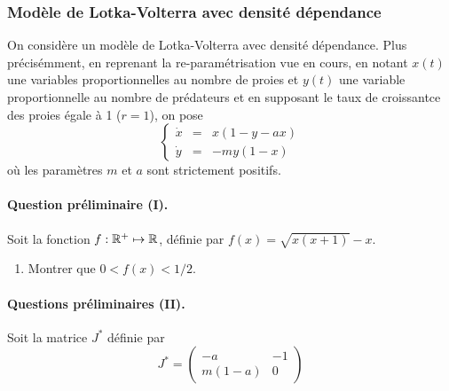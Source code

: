 \subsubsection{Modèle de Lotka-Volterra avec densité dépendance} 

On considère un modèle de Lotka-Volterra avec densité dépendance. Plus précisémment, en reprenant la re-paramétrisation vue en cours, en notant $x(t)$ une variables proportionnelles au nombre de proies et $y(t)$ une variable proportionnelle au nombre de prédateurs et en supposant le taux de croissantce des proies égale à 1 ($r = 1$), on pose
\begin{equation} \label{eq:LVDD}
\left\{\begin{array}{rcl}
        \dot x & = & x (1 - y - ax)\\ 
        \dot y & = & - m y (1 - x)
        \end{array}\right.
\end{equation}
où les paramètres $m$ et $a$ sont strictement positifs.

\bigskip
\paragraph{Question préliminaire (I).}
Soit la fonction $f: \mathbb{R}^+ \mapsto \mathbb{R}$, définie par $f(x) = \sqrt{x(x+1)} - x$.
\begin{enumerate}
  \item Montrer que $0 < f(x) < 1/2$. \label{q:LVDD-f}
\end{enumerate}

\bigskip 
\paragraph{Questions préliminaires (II).}
Soit la matrice $J^*$ définie par
\begin{equation} \label{eq:LVDD-Jstar}
  J^* = \left(\begin{array}{cc}
              -a & -1 \\ m(1-a) & 0
              \end{array}\right)
\end{equation}

